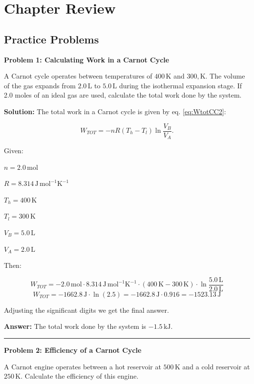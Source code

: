 \documentclass[
  9pt,
]{extbook}
\theoremstyle{definition}
\theoremstyle{definition}
\theoremstyle{definition}
\theoremstyle{remark}
\begin{document}
\hypertarget{rev5}{%
\section{Chapter Review}\label{rev5}}

\hypertarget{exer5}{%
\subsection{Practice Problems}\label{exer5}}

\textbf{Problem 1: Calculating Work in a Carnot Cycle}

A Carnot cycle operates between temperatures of \(400 \,\text{K}\) and \(300 ,\text{K}\). The volume of the gas expands from \(2.0\,\text{L}\) to \(5.0\,\text{L}\) during the isothermal expansion stage. If 2.0 moles of an ideal gas are used, calculate the total work done by the system.

\textbf{Solution:} The total work in a Carnot cycle is given by eq. \eqref{eq:WtotCC2}:

\[W_{TOT} = -nR(T_h - T_l)\ln\frac{V_B}{V_A}.\]

Given:

\(n = 2.0 \,\text{mol}\)

\(R = 8.314\,\text{J}\,\text{mol}^{-1}\text{K}^{-1}\)

\(T_h = 400\,\text{K}\)

\(T_l = 300\,\text{K}\)

\(V_B = 5.0\,\text{L}\)

\(V_A = 2.0\,\text{L}\)

Then:

\[W_{TOT} = -2.0 \,\text{mol} \cdot 8.314\,\text{J}\,\text{mol}^{-1}\text{K}^{-1} \cdot(400\,\text{K} - 300\,\text{K})\cdot \ln\frac{5.0\,\text{L}}{2.0\,\text{L}}\]
\[W_{TOT} = -1662.8\,\text{J} \cdot \ln(2.5) = -1662.8 \,\text{J} \cdot 0.916 = -1523.13\,\text{J}\]

Adjusting the significant digits we get the final answer.

\textbf{Answer:} The total work done by the system is \(-1.5 \,\text{kJ}\).

\begin{center}\rule{0.5\linewidth}{0.5pt}\end{center}

\textbf{Problem 2: Efficiency of a Carnot Cycle}

A Carnot engine operates between a hot reservoir at \(500\,\text{K}\) and a cold reservoir at \(250\,\text{K}\). Calculate the efficiency of this engine.
\end{document}
